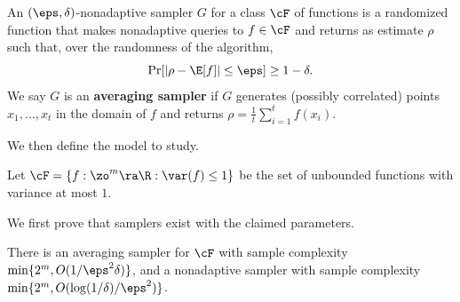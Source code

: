 \documentclass{toc}
\begin{document}
\begin{definition}
An $(\eps,\delta)$-nonadaptive sampler $G$ for a 
%
class $\cF$ of functions  %
is a randomized function that makes nonadaptive queries to $f\in \cF$ and returns as estimate $\rho$ such that, over the randomness of the algorithm,
\[\Pr[|\rho-\E[f]|\leq \eps]\geq 1- \delta.\]
We say $G$ is an \textbf{averaging sampler} if $G$ generates (possibly correlated) points $x_1,\ldots,x_t$ in the domain of $f$ and returns $\rho=\frac{1}{t}\sum_{i=1}^tf(x_i)$.
\end{definition}
We then define the model to study.
\begin{definition}
Let $\cF=\{f:\zo^m\ra\R:\var(f)\leq 1\}$ be the set of unbounded functions with variance at most $1$.
\end{definition}
We first prove that samplers exist with the claimed parameters. 
\begin{proposition}
There is an averaging sampler for $\cF$ with sample complexity $\min\{2^m,O(1/\eps^2\delta)\}$, and a nonadaptive sampler with sample complexity $\min\{2^m,O(\log(1/\delta)/\eps^2)\}$.
\end{proposition}
\end{document}
